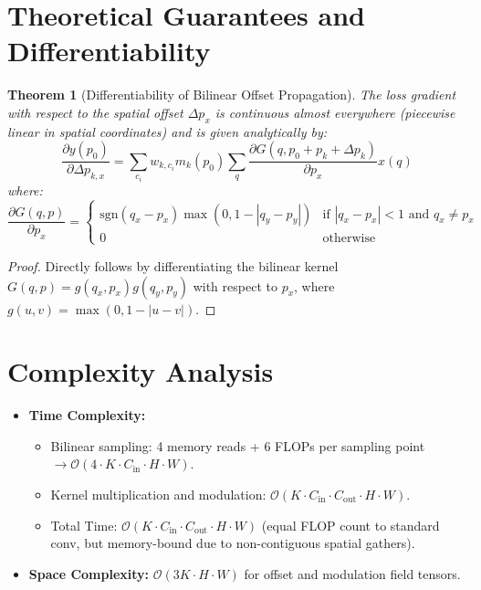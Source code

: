 \documentclass[11pt,a4paper]{article}
\newtheorem{theorem}{Theorem}
\theoremstyle{definition}
\begin{document}
\section{Theoretical Guarantees and Differentiability}

\begin{theorem}[Differentiability of Bilinear Offset Propagation]
\label{thm:differentiability}
The loss gradient with respect to the spatial offset $\Delta p_x$ is continuous almost everywhere (piecewise linear in spatial coordinates) and is given analytically by:
\begin{equation}
\frac{\partial y(p_0)}{\partial \Delta p_{k,x}} = \sum_{c_i} w_{k, c_i} m_k(p_0) \sum_{q} \frac{\partial G(q, p_0 + p_k + \Delta p_k)}{\partial p_x} x(q)
\end{equation}
where:
\begin{equation}
\frac{\partial G(q, p)}{\partial p_x} = \begin{cases}
\text{sgn}(q_x - p_x) \max(0, 1 - |q_y - p_y|) & \text{if } |q_x - p_x| < 1 \text{ and } q_x \ne p_x \\
0 & \text{otherwise}
\end{cases}
\end{equation}
\end{theorem}

\begin{proof}
Directly follows by differentiating the bilinear kernel $G(q, p) = g(q_x, p_x) g(q_y, p_y)$ with respect to $p_x$, where $g(u, v) = \max(0, 1 - |u - v|)$.
\end{proof}

\section{Complexity Analysis}

\begin{itemize}
    \item \textbf{Time Complexity:}
    \begin{itemize}
        \item Bilinear sampling: 4 memory reads + 6 FLOPs per sampling point $\to \mathcal{O}(4 \cdot K \cdot C_{\text{in}} \cdot H \cdot W)$.
        \item Kernel multiplication and modulation: $\mathcal{O}(K \cdot C_{\text{in}} \cdot C_{\text{out}} \cdot H \cdot W)$.
        \item Total Time: $\mathcal{O}\left( K \cdot C_{\text{in}} \cdot C_{\text{out}} \cdot H \cdot W \right)$ (equal FLOP count to standard conv, but memory-bound due to non-contiguous spatial gathers).
    \end{itemize}
    \item \textbf{Space Complexity:} $\mathcal{O}(3K \cdot H \cdot W)$ for offset and modulation field tensors.
\end{itemize}
\end{document}
